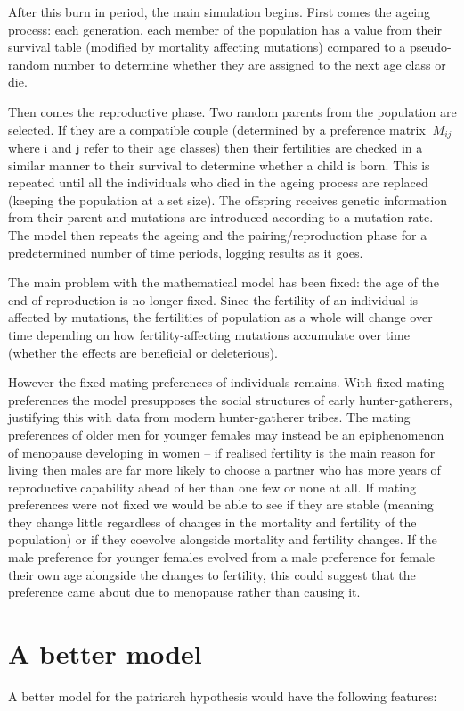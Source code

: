 \documentclass[authoryearcitations]{UoYCSproject}
\begin{document}
After this burn in period, the main simulation begins. First comes the ageing process: each generation, each member of the population has a value from their survival table (modified by mortality affecting mutations) compared to a pseudo-random number to determine whether they are assigned to the next age class or die.

Then comes the reproductive phase. Two random parents from the population are selected. If they are a compatible couple (determined by a preference matrix $\ M_{ij} $ where i and j refer to their age classes) then their fertilities are checked in a similar manner to their survival to determine whether a child is born. This is repeated until all the individuals who died in the ageing process are replaced (keeping the population at a set size). The offspring receives genetic information from their parent and mutations are introduced according to a mutation rate. The model then repeats the ageing and the pairing/reproduction phase for a predetermined number of time periods, logging results as it goes.

The main problem with the mathematical model has been fixed: the age of the end of reproduction is no longer fixed. Since the fertility of an individual is affected by mutations, the fertilities of population as a whole will change over time depending on how fertility-affecting mutations accumulate over time (whether the effects are beneficial or deleterious).

However the fixed mating preferences of individuals remains. With fixed mating preferences the model presupposes the social structures of early hunter-gatherers, justifying this with data from modern hunter-gatherer tribes. The mating preferences of older men for younger females may instead be an epiphenomenon of menopause developing in women -- if realised fertility is the main reason for living then males are far more likely to choose a partner who has more years of reproductive capability ahead of her than one few or none at all. If mating preferences were not fixed we would be able to see if they are stable (meaning they change little regardless of changes in the mortality and fertility of the population) or if they coevolve alongside mortality and fertility changes. If the male preference for younger females evolved from a male preference for female their own age alongside the changes to fertility, this could suggest that the preference came about due to menopause rather than causing it.

\section{A better model}
A better model for the patriarch hypothesis would have the following features:
\end{document}
